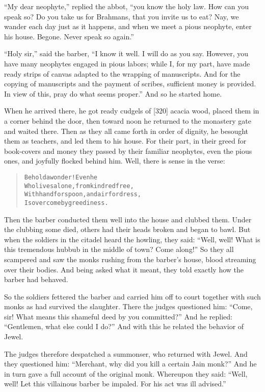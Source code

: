\documentclass[article, twoside, 14pt]{memoir}
\renewenvironment{verbatim}{%
\begin{quote}%
\vskip -10pt%
\begin{alltt}\normalfont\large}{\end{alltt}%
\end{quote}%
\vskip -10pt
} %
\begin{document}
``My dear neophyte,'' replied the abbot,
``you know the holy law. How can you speak so? Do you take us for Brahmans, that you invite us to eat? Nay, we wander each day just as it happens, and when we meet a pious neophyte, enter his house. Begone. Never speak so again.''

``Holy sir,'' said the barber,
``I know it well. I will do as you say. However, you have many neophytes engaged in pious labors; while I, for my part, have made ready strips of canvas adapted to the wrapping of manuscripts. And for the copying of manuscripts and the payment of scribes, sufficient money is provided. In view of this, pray do what seems proper.''
And so he started home.

When he arrived there, he got ready cudgels of [320] acacia wood,
placed them in a corner behind the door, then toward noon he
returned to the monastery gate and waited there. Then as they all
came forth in order of dignity, he besought them as teachers, and
led them to his house. For their part, in their greed for
book-covers and money they passed by their familiar neophytes, even
the pious ones, and joyfully flocked behind him. Well, there is
sense in the verse:

\begin{verbatim}
Behold a wonder! Even he
Who lives alone, from kindred free,
With hand for spoon, and air for dress,
Is overcome by greediness.
\end{verbatim}
Then the barber conducted them well into the house and clubbed
them. Under the clubbing some died, others had their heads broken
and began to bawl. But when the soldiers in the citadel heard the
howling, they said:
``Well, well! What is this tremendous hubbub in the middle of town? Come along!''
So they all scampered and saw the monks rushing from the barber's
house, blood streaming over their bodies. And being asked what it
meant, they told exactly how the barber had behaved.

So the soldiers fettered the barber and carried him off to court
together with such monks as had survived the slaughter. There the
judges questioned him:
``Come, sir! What means this shameful deed by you committed?'' And
he replied: ``Gentlemen, what else could I do?'' And with this he
related the behavior of Jewel.

The judges therefore despatched a summonser, who returned with
Jewel. And they questioned him:
``Merchant, why did you kill a certain Jain monk?'' And he in turn
gave a full account of the original monk. Whereupon they said:
``Well, well! Let this villainous barber be impaled. For his act was ill advised.''
\end{document}

